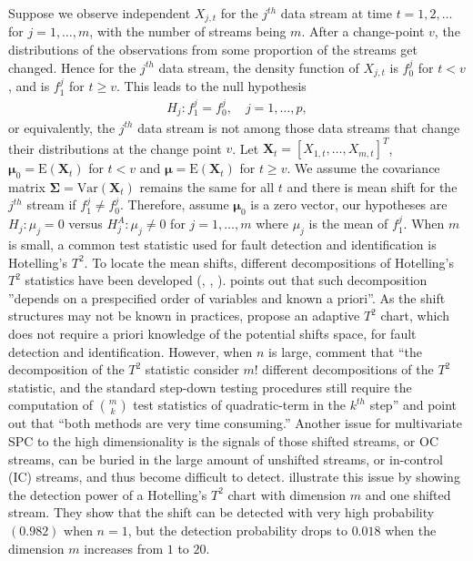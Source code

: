 \documentclass[]{interact}
\theoremstyle{plain}%
\theoremstyle{definition}
\theoremstyle{remark}
\newcommand{\E}{\mathrm{E}}
\newcommand{\Var}{\mathrm{Var}}
\begin{document}
Suppose we observe independent $X_{j,t}$ for the $j^{th}$ data stream at time $t = 1, 2, \ldots $ for $j = 1, \ldots, m$, with the number of streams being $m$. After a change-point $v$, the distributions of the observations from some proportion of the streams get changed. Hence for the $j^{th}$ data stream, the density function of $X_{j,t}$ is $f_0^{j}$ for $t<v$, and is $f_1^j$ for $t \ge v $. This leads to the null hypothesis 
\begin{align}
H_j: f_1^j = f_0^j,\quad j=1,\ldots,p, \label{p Hj}
\end{align}
or equivalently, the $j^{th}$ data stream is not among those data streams that change their distributions at the change point $v$. Let $\mathbf{X}_t = [X_{1,t}, \ldots, X_{m,t}]^T$, $\bm{\mu}_0 = \E(\mathbf{X}_t)$ for $t<v$ and $\bm{\mu} = \E(\mathbf{X}_t)$ for $t\ge v$. We assume the covariance matrix $\bm{\Sigma} = \Var(\mathbf{X}_t)$ remains the same for all $t$ and there is mean shift for the $j^{th}$ stream if $f_1^j \ne f_0^j$. Therefore, assume $\bm{\mu}_0$ is a zero vector, our hypotheses are $H_{j}: \mu_{j} = 0$ versus $H_{j}^A: \mu_{j} \ne 0$ for $j = 1, \ldots, m$ where $\mu_j$ is the mean of $f_1^j$. When $m$ is small, a common test statistic used for fault detection and identification is Hotelling's $T^2$. To locate the mean shifts, different decompositions of Hotelling's $T^2$ statistics have been developed (\cite{mason1995decomposition}, \cite{mason1997practical}, \cite{li2008causation}). \cite{zhu2009adaptive} points out that such decomposition ''depends on a prespecified order of variables and known a priori''. As the shift structures may not be known in practices, \cite{zhu2009adaptive} propose an adaptive $T^2$ chart, which does not require a priori knowledge of the potential shifts space, for fault detection and identification. However, when $n$ is large, \cite{li2020diagnostic} comment that 	``the decomposition of the $T^2$ statistic consider $m!$ different decompositions of the $T^2$ statistic, and the standard step-down testing procedures still require the computation of $\binom{m}{k}$ test statistics of quadratic-term in the $k^{th}$ step'' and point out that ``both methods are very time consuming.'' Another issue for multivariate SPC to the high dimensionality is the signals of those shifted streams, or OC streams, can be buried in the large amount of unshifted streams, or in-control (IC) streams, and thus become difficult to detect. \cite{wang2009high} illustrate this issue by showing the detection power of a Hotelling's $T^2$ chart with dimension $m$ and one shifted stream. They show that the shift can be detected with very high probability $(0.982)$ when $n=1$, but the detection probability drops to $0.018$ when the dimension $m$ increases from $1$ to $20$.
\end{document}
